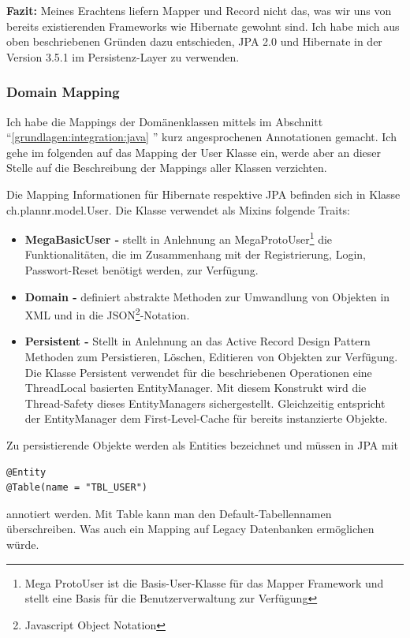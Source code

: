 \textbf{Fazit: }Meines Erachtens liefern Mapper und Record nicht das, was wir uns von bereits existierenden Frameworks wie Hibernate gewohnt sind. Ich habe mich aus oben beschriebenen Gr\"unden dazu entschieden, JPA 2.0 und Hibernate in der Version 3.5.1 im Persistenz-Layer zu verwenden. 


\subsubsection{Domain Mapping}
Ich habe die Mappings der Dom\"anenklassen mittels im Abschnitt ``\ref{grundlagen:integration:java} '' kurz angesprochenen Annotationen gemacht. Ich gehe im folgenden auf das Mapping der User Klasse ein, werde aber an dieser Stelle auf die Beschreibung der Mappings aller Klassen verzichten. 

Die Mapping Informationen f\"ur Hibernate respektive JPA befinden sich in Klasse ch.plannr.model.User. Die Klasse verwendet als Mixins folgende Traits:
\begin{itemize}
	\item \textbf{MegaBasicUser - }stellt in Anlehnung an MegaProtoUser\footnote{Mega ProtoUser ist die Basis-User-Klasse f\"ur das Mapper Framework und stellt eine Basis f\"ur die Benutzerverwaltung zur Verf\"ugung} die Funktionalit\"aten, die im Zusammenhang mit der Registrierung, Login, Passwort-Reset ben\"otigt werden, zur Verf\"ugung. 
	\item \textbf{Domain -} definiert abstrakte Methoden zur Umwandlung von Objekten in XML und in die JSON\footnote{Javascript Object Notation}-Notation. 
	\item \textbf{Persistent - }Stellt in Anlehnung an das Active Record Design Pattern Methoden zum Persistieren, L\"oschen, Editieren von Objekten zur Verf\"ugung. Die Klasse Persistent verwendet f\"ur die beschriebenen Operationen eine ThreadLocal basierten EntityManager. Mit diesem Konstrukt wird die Thread-Safety dieses EntityManagers sichergestellt. Gleichzeitig entspricht der EntityManager dem First-Level-Cache f\"ur bereits instanzierte Objekte.	
\end{itemize}

Zu persistierende Objekte werden als Entities bezeichnet und m\"ussen in JPA mit 
\begin{lstlisting}[caption=User: ScalaJPA Entity Definiton]
@Entity
@Table(name = "TBL_USER")
\end{lstlisting}

annotiert werden. Mit Table kann man den Default-Tabellennamen \"uberschreiben. Was auch ein Mapping auf Legacy Datenbanken erm\"oglichen w\"urde.

